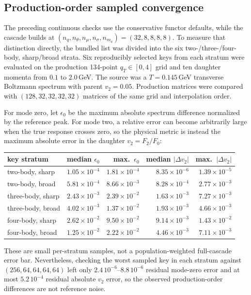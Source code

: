 \documentclass[11pt]{article}
\begin{document}
\subsection{Production-order sampled convergence}

The preceding continuous checks use the conservative functor defaults, while
the cascade builds at $(n_q,n_\theta,n_\mu,n_\sigma,n_{m_a})=(32,8,8,8,8)$.
To measure that distinction directly, the bundled list was divided into the
six two-/three-/four-body, sharp/broad strata.  Six reproducibly selected
keys from each stratum were evaluated on the production 134-point
$q_T\in[0,4]$ grid and ten daughter momenta from $0.1$ to $2.0$\,GeV.  The
source was a $T=0.145$\,GeV transverse Boltzmann spectrum with parent
$v_2=0.05$.  Production matrices were compared with
$(128,32,32,32,32)$ matrices of the same grid and interpolation order.

For mode zero, let $\epsilon_0$ be the maximum absolute spectrum difference
normalized by the reference peak.  For mode two, a relative error can become
arbitrarily large when the true response crosses zero, so the physical metric
is instead the maximum absolute error in the daughter
$v_2=F_2/F_0$:
\begin{center}\small
\begin{tabular}{lrrrr}
\hline
key stratum
& median $\epsilon_0$ & max.\ $\epsilon_0$
& median $|\Delta v_2|$ & max.\ $|\Delta v_2|$\\
\hline
two-body, sharp   & $1.05{\times}10^{-4}$ & $1.81{\times}10^{-4}$ & $8.35{\times}10^{-6}$ & $1.39{\times}10^{-5}$\\
two-body, broad   & $5.81{\times}10^{-4}$ & $8.66{\times}10^{-3}$ & $8.28{\times}10^{-4}$ & $2.77{\times}10^{-3}$\\
three-body, sharp & $2.43{\times}10^{-3}$ & $2.39{\times}10^{-2}$ & $1.63{\times}10^{-3}$ & $7.27{\times}10^{-3}$\\
three-body, broad & $4.02{\times}10^{-3}$ & $1.37{\times}10^{-2}$ & $1.93{\times}10^{-3}$ & $4.66{\times}10^{-3}$\\
four-body, sharp  & $2.62{\times}10^{-2}$ & $9.50{\times}10^{-2}$ & $9.14{\times}10^{-3}$ & $1.43{\times}10^{-2}$\\
four-body, broad  & $1.25{\times}10^{-2}$ & $2.22{\times}10^{-2}$ & $4.46{\times}10^{-3}$ & $7.11{\times}10^{-3}$\\
\hline
\end{tabular}
\end{center}
These are small per-stratum samples, not a population-weighted full-cascade
error bar.  Nevertheless,
checking the worst sampled key in each stratum against
$(256,64,64,64,64)$ left only $2.4\,10^{-6}$--$8.8\,10^{-6}$ residual
mode-zero error and at most $5.2\,10^{-4}$ residual absolute $v_2$ error, so
the observed production-order differences are not reference noise.
\end{document}
